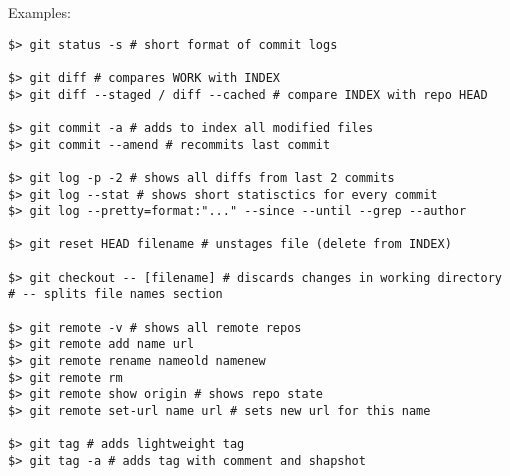 \documentclass[main.tex]{subfiles}
\begin{document}
Examples:
\begin{lstlisting}
$> git status -s # short format of commit logs

$> git diff # compares WORK with INDEX
$> git diff --staged / diff --cached # compare INDEX with repo HEAD

$> git commit -a # adds to index all modified files
$> git commit --amend # recommits last commit

$> git log -p -2 # shows all diffs from last 2 commits
$> git log --stat # shows short statisctics for every commit
$> git log --pretty=format:"..." --since --until --grep --author

$> git reset HEAD filename # unstages file (delete from INDEX)

$> git checkout -- [filename] # discards changes in working directory
# -- splits file names section

$> git remote -v # shows all remote repos
$> git remote add name url
$> git remote rename nameold namenew
$> git remote rm
$> git remote show origin # shows repo state
$> git remote set-url name url # sets new url for this name

$> git tag # adds lightweight tag
$> git tag -a # adds tag with comment and shapshot
\end{lstlisting}
\end{document}
